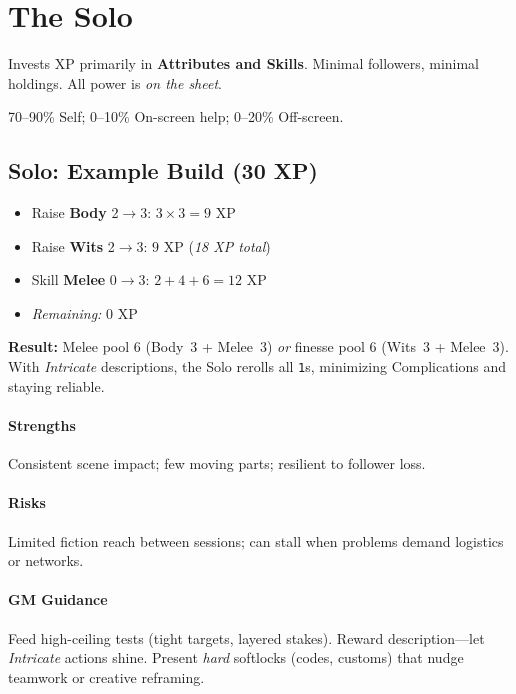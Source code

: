 \documentclass[12pt]{book}
\begin{document}
\section{The Solo}
\begin{description}[leftmargin=2cm]
  \item[Definition:] Invests XP primarily in \textbf{Attributes and Skills}. Minimal followers, minimal holdings. All power is \emph{on the sheet}.
  \item[Typical XP Spread:] 70--90\% Self; 0--10\% On-screen help; 0--20\% Off-screen.
\end{description}

\subsection*{Solo: Example Build (30 XP)}
\begin{itemize}
  \item Raise \textbf{Body} 2$\rightarrow$3: $3\times 3=9$ XP
  \item Raise \textbf{Wits} 2$\rightarrow$3: $9$ XP \hfill (\emph{18 XP total})
  \item Skill \textbf{Melee} 0$\rightarrow$3: $2+4+6=12$ XP
  \item \emph{Remaining:} 0 XP
\end{itemize}

\textbf{Result:} Melee pool 6 (Body~3 + Melee~3) \emph{or} finesse pool 6 (Wits~3 + Melee~3).  
With \emph{Intricate} descriptions, the Solo rerolls all \texttt{1}s, minimizing Complications and staying reliable.

\paragraph{Strengths} Consistent scene impact; few moving parts; resilient to follower loss.  
\paragraph{Risks} Limited fiction reach between sessions; can stall when problems demand logistics or networks.  
\paragraph{GM Guidance} Feed high-ceiling tests (tight targets, layered stakes). Reward description---let \emph{Intricate} actions shine. Present \emph{hard} softlocks (codes, customs) that nudge teamwork or creative reframing.
\end{document}
